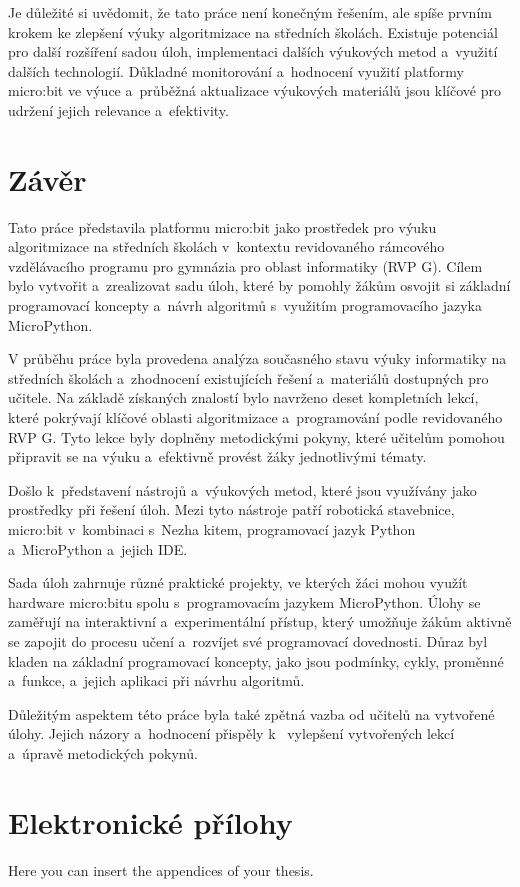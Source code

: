 \documentclass[
  digital,     %
  oneside,     %
  nosansbold,  %
  colorbold, %
  lof,         %
  nolot,         %
]{fithesis4}
\begin{document}
Je důležité si uvědomit, že tato práce není konečným řešením, ale spíše prvním krokem ke zlepšení výuky algoritmizace na středních školách. Existuje potenciál pro další rozšíření sadou úloh, implementaci dalších výukových metod a~využití dalších technologií. Důkladné monitorování a~hodnocení využití platformy micro:bit ve výuce a~průběžná aktualizace výukových materiálů jsou klíčové pro udržení jejich relevance a~efektivity.

\chapter{Závěr}
Tato práce představila platformu micro:bit jako prostředek pro výuku algoritmizace na středních školách v~kontextu revidovaného rámcového vzdělávacího programu pro gymnázia pro oblast informatiky (RVP G). Cílem bylo vytvořit a~zrealizovat sadu úloh, které by pomohly žákům osvojit si základní programovací koncepty a~návrh algoritmů s~využitím programovacího jazyka MicroPython.

V průběhu práce byla provedena analýza současného stavu výuky informatiky na středních školách a~zhodnocení existujících řešení a~materiálů dostupných pro učitele. Na základě získaných znalostí bylo navrženo deset kompletních lekcí, které pokrývají klíčové oblasti algoritmizace a~programování podle revidovaného RVP G. Tyto lekce byly doplněny metodickými pokyny, které učitelům pomohou připravit se na výuku a~efektivně provést žáky jednotlivými tématy.

Došlo k~představení nástrojů a~výukových metod, které jsou využívány jako prostředky při řešení úloh. Mezi tyto nástroje patří robotická stavebnice, micro:bit v~kombinaci s~Nezha kitem, programovací jazyk Python a~MicroPython a~jejich IDE.

Sada úloh zahrnuje různé praktické projekty, ve kterých žáci mohou využít hardware micro:bitu spolu s~programovacím jazykem MicroPython. Úlohy se zaměřují na interaktivní a~experimentální přístup, který umožňuje žákům aktivně se zapojit do procesu učení a~rozvíjet své programovací dovednosti. Důraz byl kladen na základní programovací koncepty, jako jsou podmínky, cykly, proměnné a~funkce, a~jejich aplikaci při návrhu algoritmů.

Důležitým aspektem této práce byla také zpětná vazba od učitelů na vytvořené úlohy. Jejich názory a~hodnocení přispěly k~ vylepšení vytvořených lekcí a~úpravě metodických pokynů. 

\printbibliography[heading=bibintoc] %

  \makeatletter\thesis@blocks@clear\makeatother
  \printindex

\appendix %
\chapter{Elektronické přílohy}
Here you can insert the appendices of your thesis.
\end{document}
